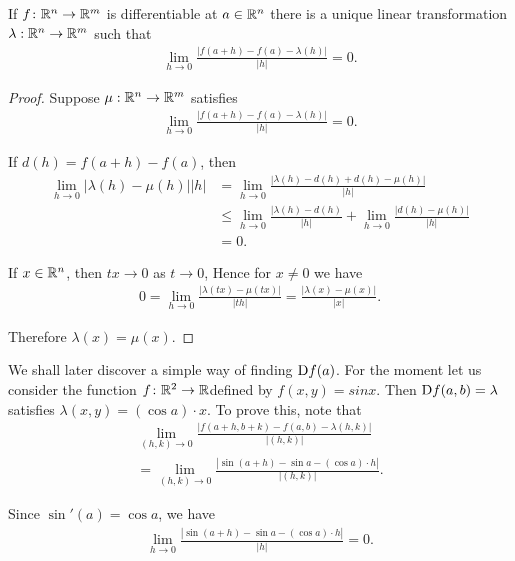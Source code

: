 \begin{theorem}
    If $f\colon{}\mathbb{R}^n\to \mathbb{R}^m$ is differentiable at $a\in \mathbb{R}^n$ there is a unique linear 
    transformation $\lambda: \mathbb{R}^n\to \mathbb{R}^m$ such that
    \begin{align*}
        \lim_{h\to 0 }{\frac{|f(a+h)-f(a)-\lambda(h)|}{|h|}} = 0.
    \end{align*}
\end{theorem}

\begin{proof}
    Suppose $\mu:\mathbb{R}^n\to \mathbb{R}^m$ satisfies 
    \begin{align*}
        \lim_{h\to 0 }{\frac{|f(a+h)-f(a)-\lambda(h)|}{|h|}} = 0.
    \end{align*}

    If $d(h) = f(a+h) - f(a)$, then
    \begin{align*}
        \lim_{h\to 0 }{|\lambda(h)-\mu(h)|}{|h|}
        & = \lim_{h\to 0}{\frac{|\lambda(h) - d(h) + d(h) - \mu(h)|}{|h|}} \\
        & \le \lim_{h\to 0}{\frac{|\lambda(h) - d(h)}{|h|}} + \lim_{h\to 0}{\frac{|d(h) - \mu(h)|}{|h|}} \\
        & = 0.
    \end{align*}

    If $x\in \mathbb{R}^n$, then $tx\to 0$ as $t\to 0$, Hence for $x\neq 0$ we have 
    \begin{align*}
        0 = \lim_{h\to 0}{\frac{|\lambda(tx) - \mu(tx)|}{|th|}} = \frac{|\lambda(x) - \mu(x)|}{|x|}.
    \end{align*}

    Therefore $\lambda(x) = \mu(x)$.
\end{proof}

We shall later discover a simple way of finding $\mathrm{D}f(a)$. For
the moment let us consider the function $f\colon{}\mathbb{R}^2 \to \mathbb{R}$defined by
$f(x,y) = sin x$. Then $\mathrm{D}f(a,b) = \lambda$ satisfies $\lambda(x,y) = (\cos a)\cdot x$.
To prove this, note that
\begin{align*}
    \lim_{(h, k)\to 0}{\frac{|f(a+h, b+k) - f(a, b) - \lambda(h, k)|}{|(h, k)|}}\\
        = \lim_{(h, k)\to 0}{\frac{|\sin(a+h) - \sin a - (\cos a)\cdot h|}{|(h, k)|}}.
\end{align*}

Since $\sin'(a) = \cos a$, we have 
\begin{align*}
    \lim_{h\to 0}{\frac{|\sin(a+h) - \sin a - (\cos a)\cdot h|}{|h|}} = 0.
\end{align*}


